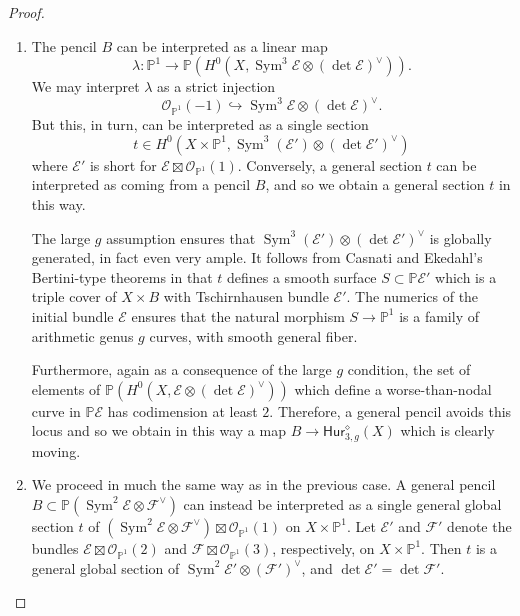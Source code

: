 \documentclass[reqno, 11pt]{amsart}
\renewcommand{\P}{\mathbb{P}}
\renewcommand{\O}{\mathcal{O}}
\DeclareMathOperator{\Sym}{Sym}
\newcommand{\Hurstable}[2]{\mathsf{Hur}_{#1,#2}^{\diamond}}
\begin{document}
\begin{proof}
    \begin{enumerate}
        \item The pencil $B$ can be interpreted as a linear map $$\lambda: \P^{1} \to \P (H^{0}(X, \Sym^{3} \mathcal{E} \otimes (\det \mathcal{E})^{\vee})).$$ We may interpret $\lambda$ as a strict injection \[\O_{\P^{1}}(-1) \hookrightarrow \Sym^{3} \mathcal{E} \otimes (\det \mathcal{E})^{\vee}.\] But this, in turn, can be interpreted as a single section  \[t \in H^{0}\left( X \times \P^{1}, \Sym^{3} (\mathcal{E'}) \otimes (\det \mathcal{E'})^{\vee} \right)\] where $\mathcal{E}'$ is short for $\mathcal{E} \boxtimes \O_{\P^{1}}(1)$.  Conversely, a general section $t$ can be interpreted as coming from a pencil $B$, and so we obtain a general section $t$ in this way.  
        
        The large $g$ assumption ensures that $\Sym^{3} (\mathcal{E'}) \otimes (\det \mathcal{E'})^{\vee}$ is globally generated, in fact even very ample.  It follows from Casnati and Ekedahl's Bertini-type theorems in \cite{casnatiekedahlI,casnati1996covers} that $t$ defines a smooth surface $S \subset \P \mathcal{E}'$ which is a triple cover of $X \times B$ with Tschirnhausen bundle $\mathcal{E}'$. The numerics of the initial bundle $\mathcal{E}$ ensures that the natural morphism $S \to \P^{1}$ is a family of arithmetic genus $g$ curves, with smooth general fiber.   
        
        Furthermore, again as a consequence of the large $g$ condition, the set of elements of $\P (H^{0}(X, \mathcal{E}\otimes (\det \mathcal{E})^{\vee}))$ which define a worse-than-nodal curve in $\P \mathcal{E}$ has codimension at least $2$.  Therefore, a general pencil avoids this locus and so we obtain in this way a map $B \to \Hurstable{3}{g}(X)$ which is clearly moving. 
        
        \item We proceed in much the same way as in the previous case. A general pencil $B \subset \P (\Sym^{2}\mathcal{E} \otimes \mathcal{F}^{\vee})$ can instead be interpreted as a single general global section $t$ of $\left( \Sym^{2} \mathcal{E} \otimes \mathcal{F}^{\vee} \right) \boxtimes \O_{\P^{1}}(1)$ on $X \times \P^{1}$.  Let $\mathcal{E}'$ and $\mathcal{F}'$ denote the bundles $\mathcal{E} \boxtimes \O_{\P^{1}}(2)$ and $\mathcal{F} \boxtimes \O_{\P^{1}}(3)$, respectively, on $X \times \P^{1}$.  Then $t$ is a general global section of $\Sym^{2} \mathcal{E}' \otimes (\mathcal{F}')^{\vee}$, and $\det \mathcal{E}' = \det \mathcal{F}'$. 
        

\end{enumerate}
\end{proof}
\end{document}
